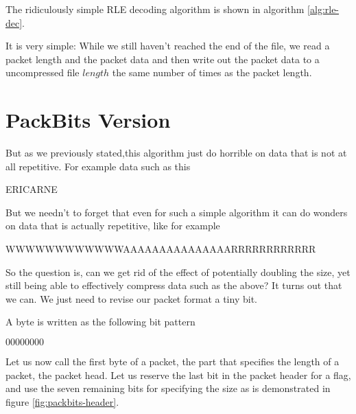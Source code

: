 \begin{refsection}
\begin{algorithm}
\begin{algorithmic}[1]

    \While{\neof}
        \State {}
      \EndRepeatn


    \EndWhile
  \end{algorithmic}
\end{algorithm}

The ridiculously simple RLE decoding algorithm is shown in algorithm
\ref{alg:rle-dec}.

It is very simple: While we still haven't reached the end of the file,
we read a packet length and the packet data and then write out the
packet data to a uncompressed file $length$ the same number of times
as the packet length.

\section{PackBits Version}
\label{sec:packbits-version}

But as we previously stated,this algorithm just do horrible on data that
is not at all repetitive. For example data such as this

\begin{indentpar}
  ERICARNE
\end{indentpar}

But we needn't to forget that even for such a simple algorithm it can do
wonders on data that is actually repetitive, like for example

\begin{indentpar}
  WWWWWWWWWWWWAAAAAAAAAAAAAAARRRRRRRRRRRR
\end{indentpar}

So the question is, can we get rid of the effect of potentially
doubling the size, yet still being able to effectively compress data
such as the above?  It turns out that we can. We just need to revise
our packet format a tiny bit.

A byte is written as the following bit pattern

\begin{indentpar}
  $00000000$
\end{indentpar}

Let us now call the first byte of a packet, the part that specifies
the length of a packet, the packet head. Let us
reserve the last bit in the packet header for a flag, and use the
seven remaining bits for specifying the size as is demonstrated in
figure \ref{fig:packbits-header}.


\end{refsection}
